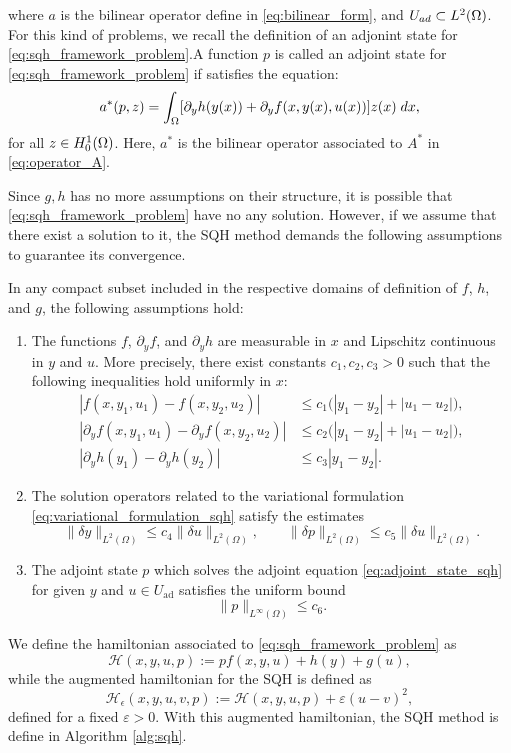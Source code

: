 where $a$ is the bilinear operator define in \eqref{eq:bilinear_form}, and $U_{ad}\subset L^2(\Omega)$. For this kind of problems, we recall the definition of an adjonint state for \eqref{eq:sqh_framework_problem}.A function $p$ is called an adjoint state for \eqref{eq:sqh_framework_problem} if satisfies the equation:
\begin{equation}\label{eq:adjoint_state_sqh}
    a^*(p,z)=\int_{\Omega}[\partial_y h(y(x))+\partial_y f(x,y(x),u(x))]z(x)\; dx,
\end{equation}
for all $z\in H_0^1(\Omega)$. Here, $a^{*}$ is the bilinear operator associated to $A^*$ in \eqref{eq:operator_A}.

Since $g,h$ has no more assumptions on their structure, it is possible that \eqref{eq:sqh_framework_problem} have no any solution. However, if we assume that there exist a solution to it, the SQH method demands the following assumptions to guarantee its convergence.
\begin{assumption}\label{assumption:sqh}
    In any compact subset included in the respective domains of definition of
$f$, $h$, and $g$, the following assumptions hold:
\begin{enumerate}
\item
The functions $f$, $\partial_y f$, and $\partial_y h$ are measurable in $x$
and Lipschitz continuous in $y$ and $u$. More precisely, there exist constants
$c_1,c_2,c_3>0$ such that the following inequalities hold uniformly in $x$:
\begin{align*}
|f(x,y_1,u_1)-f(x,y_2,u_2)|
&\le c_1\big(|y_1-y_2|+|u_1-u_2|\big),\\
|\partial_y f(x,y_1,u_1)-\partial_y f(x,y_2,u_2)|
&\le c_2\big(|y_1-y_2|+|u_1-u_2|\big),\\
|\partial_y h(y_1)-\partial_y h(y_2)|
&\le c_3 |y_1-y_2|.
\end{align*}

\item
The solution operators related to the variational formulation  \eqref{eq:variational_formulation_sqh} satisfy the estimates
\[
\|\delta y\|_{L^2(\Omega)} \le c_4 \|\delta u\|_{L^2(\Omega)}, 
\qquad
\|\delta p\|_{L^2(\Omega)} \le c_5 \|\delta u\|_{L^2(\Omega)}.
\]

\item
The adjoint state $p$ which solves the adjoint equation \eqref{eq:adjoint_state_sqh} for given $y$ and $u\in U_{\mathrm{ad}}$
satisfies the uniform bound
\[
\|p\|_{L^\infty(\Omega)} \le c_6.
\]
\end{enumerate}
\end{assumption}
We define the hamiltonian associated to \eqref{eq:sqh_framework_problem} as
\begin{equation}\label{eq:hamiltonian_sqh}
    \mathcal{H}(x,y,u,p):=pf(x,y,u)+h(y)+g(u),
\end{equation}
while the augmented hamiltonian for the SQH is defined as
\begin{equation}
    \mathcal{H}_{\epsilon}(x,y,u,v,p):=\mathcal{H}(x,y,u,p)+\varepsilon (u-v)^2,
\end{equation}
defined for a fixed $\varepsilon>0$. With this augmented hamiltonian, the SQH method is define in Algorithm  \ref{alg:sqh}.

